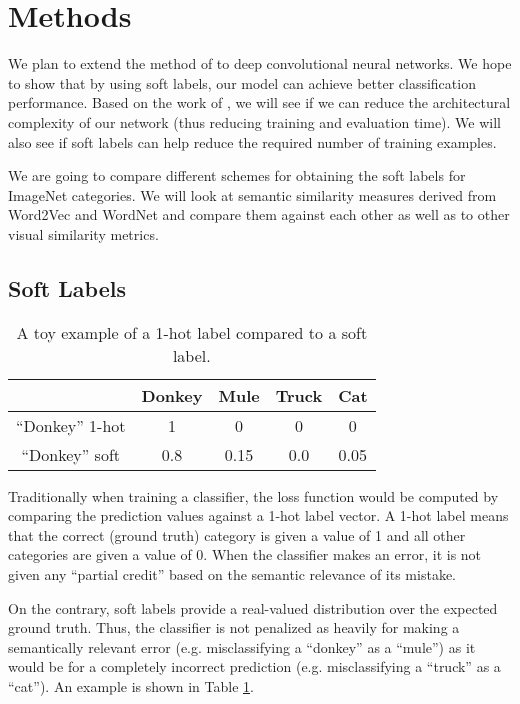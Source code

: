 \section{Methods}

We plan to extend the method of \cite{zhao2011large} to deep convolutional
neural networks.
We hope to show that by using soft labels, our model can achieve better
classification performance.
Based on the work of \cite{hinton2015distilling}, we will see if we can reduce
the architectural complexity of our network (thus reducing training and
evaluation time). We will also see if soft labels can help reduce the required
number of training examples.

We are going to compare different schemes for obtaining the soft labels for
ImageNet categories.
We will look at semantic similarity measures derived from Word2Vec and WordNet
and compare them against each other as well as to other visual similarity
metrics.



\subsection{Soft Labels}
\label{sec:soft_labels}

\begin{table}[!tb]
  \centering
  \begin{tabular}{|c|c|c|c|c|}
    \hline
      & Donkey & Mule & Truck & Cat \\
    \hline
      ``Donkey'' 1-hot & 1 & 0 & 0 & 0 \\
    \hline
      ``Donkey'' soft & 0.8 & 0.15 & 0.0 & 0.05 \\
    \hline
  \end{tabular}
  \caption{
    A toy example of a 1-hot label compared to a soft label.
  }
  \label{tbl:soft_labels}
\end{table}

Traditionally when training a classifier, the loss function would be computed
by comparing the prediction values against a 1-hot label vector.
A 1-hot label means that the correct (ground truth) category is given a value
of 1 and all other categories are given a value of 0.
When the classifier makes an error, it is not given any ``partial credit''
based on the semantic relevance of its mistake.

On the contrary, soft labels provide a real-valued distribution over the
expected ground truth. Thus, the classifier is not penalized as heavily for
making a semantically relevant error (e.g. misclassifying a ``donkey'' as a
``mule'') as it would be for a completely incorrect prediction (e.g.
misclassifying a ``truck'' as a ``cat'').
An example is shown in Table \ref{tbl:soft_labels}.



